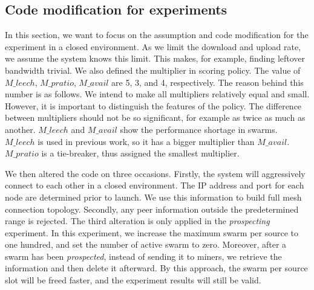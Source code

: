 %

\subsection{Code modification for experiments}
\label{section:predlsetup}
In this section, we want to focus on the assumption and code modification for the experiment in a closed environment. As we limit the download and upload rate, we assume the system knows this limit. This makes, for example, finding leftover bandwidth trivial. We also defined the multiplier in scoring policy. The value of $M\_leech$, $M\_pratio$, $M\_avail$ are 5, 3, and 4, respectively. The reason behind this number is as follows. We intend to make all multipliers relatively equal and small. However, it is important to distinguish the features of the policy. The difference between multipliers should not be so significant, for example as twice as much as another. $M\_leech$ and $M\_avail$ show the performance shortage in swarms. $M\_leech$ is used in previous work, so it has a bigger multiplier than $M\_avail$. $M\_pratio$ is a tie-breaker, thus assigned the smallest multiplier.

We then altered the code on three occasions. Firstly, the system will aggressively connect to each other in a closed environment. The IP address and port for each node are determined prior to launch. We use this information to build full mesh connection topology. Secondly, any peer information outside the predetermined range is rejected. The third alteration is only applied in the \textit{prospecting} experiment. In this experiment, we increase the maximum swarm per source to one hundred, and set the number of active swarm to zero. Moreover, after a swarm has been \textit{prospected}, instead of sending it to miners, we retrieve the information and then delete it afterward. By this approach, the swarm per source slot will be freed faster, and the experiment results will still be valid. 

